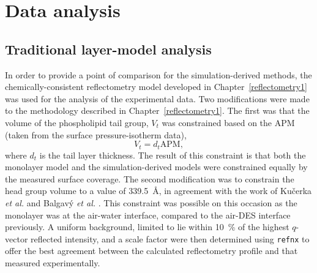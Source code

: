 \section{Data analysis}
\subsection{Traditional layer-model analysis}
In order to provide a point of comparison for the simulation-derived methods, the chemically-consistent reflectometry model developed in Chapter~\ref{reflectometry1} was used for the analysis of the experimental data.
Two modifications were made to the methodology described in Chapter~\ref{reflectometry1}.
The first was that the volume of the phospholipid tail group, $V_t$ was constrained based on the APM (taken from the surface pressure-isotherm data),
%
\begin{equation}
V_t = d_t\text{APM},
\end{equation}
%
where $d_t$ is the tail layer thickness. The result of this constraint is that both the monolayer model and the simulation-derived models were constrained equally by the measured surface coverage.
The second modification was to constrain the head group volume to a value of \SI{339.5}{\angstrom}, in agreement with the work of Ku\v{c}erka \emph{et al.} \cite{kucerka_determination_2004} and Balgav\'{y} \emph{et al.} \cite{balgavy_evaluation_2001}.
This constraint was possible on this occasion as the monolayer was at the air-water interface, compared to the air-DES interface previously.
A uniform background, limited to lie within \SI{10}{\percent} of the highest $q$-vector reflected intensity, and a scale factor were then determined using \texttt{refnx} to offer the best agreement between the calculated reflectometry profile and that measured experimentally.

